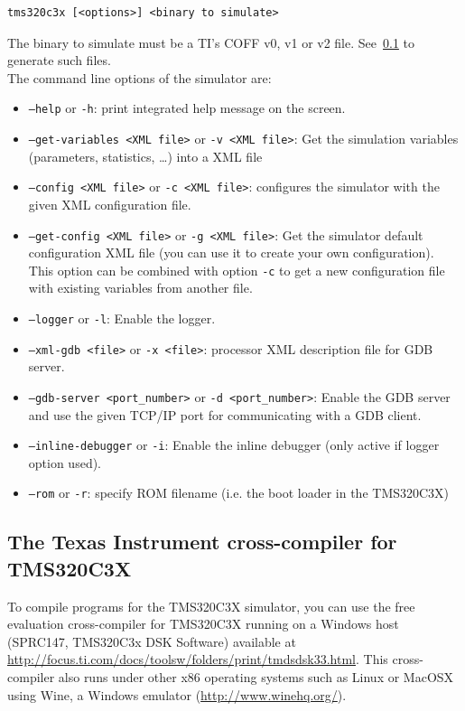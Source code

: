 \begin{verbatim}
tms320c3x [<options>] <binary to simulate>
\end{verbatim}

\noindent The binary to simulate must be a TI's COFF v0, v1 or v2 file. See~\ref{tms320c3x_cross_compiler} to generate such files.
\newline\\
\noindent The command line options of the simulator are:

\begin{itemize}
\item \texttt{--help} or \texttt{-h}: print integrated help message on the screen.
\item \texttt{--get-variables <XML file>} or \texttt{-v <XML file>}: Get the simulation variables (parameters, statistics, \ldots) into a XML file
\item \texttt{--config <XML file>} or \texttt{-c <XML file>}: configures the simulator with the given XML configuration file.
\item \texttt{--get-config <XML file>} or \texttt{-g <XML file>}: Get the simulator default configuration XML file (you can use it to create your own configuration). This option can be combined with option \texttt{-c} to get a new configuration file with existing variables from another file.
\item \texttt{--logger} or \texttt{-l}: Enable the logger.
\item \texttt{--xml-gdb <file>} or \texttt{-x <file>}: processor XML description file for GDB server.
\item \texttt{--gdb-server <port\_number>} or \texttt{-d <port\_number>}: Enable the GDB server and use the given TCP/IP port for communicating with a GDB client.
\item \texttt{--inline-debugger} or \texttt{-i}: Enable the inline debugger (only active if logger option used).
\item \texttt{--rom} or \texttt{-r}: specify ROM filename (i.e. the boot loader in the TMS320C3X)
\end{itemize}

\subsection{The Texas Instrument cross-compiler for TMS320C3X}
\label{tms320c3x_cross_compiler}

To compile programs for the TMS320C3X simulator, you can use the free evaluation cross-compiler for TMS320C3X running on a Windows host (SPRC147, TMS320C3x DSK Software) available at \url{http://focus.ti.com/docs/toolsw/folders/print/tmdsdsk33.html}.
This cross-compiler also runs under other x86 operating systems such as Linux or MacOSX using Wine, a Windows emulator (\url{http://www.winehq.org/}).

